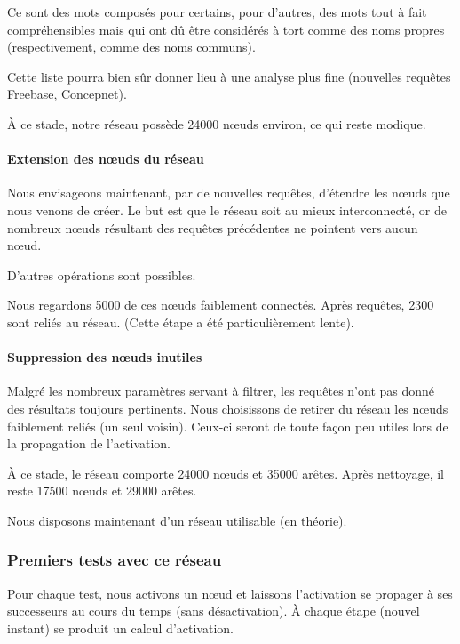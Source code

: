 \documentclass[a4paper, 12pt]{article}
\begin{document}
Ce sont des mots composés pour certains, pour d'autres, des mots tout à fait compréhensibles mais qui ont dû être considérés à tort comme des noms propres (respectivement, comme des noms communs).

Cette liste pourra bien sûr donner lieu à une analyse plus fine (nouvelles requêtes Freebase, Concepnet).

\`A ce stade, notre réseau possède 24000 nœuds environ, ce qui reste modique.

\paragraph{Extension des nœuds du réseau}

Nous envisageons maintenant, par de nouvelles requêtes, d'étendre les nœuds que nous venons de créer. Le but est que le réseau soit au mieux interconnecté, or de nombreux nœuds résultant des requêtes précédentes ne pointent vers aucun nœud.

D'autres opérations sont possibles.

Nous regardons 5000 de ces nœuds faiblement connectés. Après requêtes, 2300 sont reliés au réseau. (Cette étape a été particulièrement lente).

\paragraph{Suppression des nœuds inutiles}

Malgré les nombreux paramètres servant à filtrer, les requêtes n'ont pas donné des résultats toujours pertinents. Nous choisissons de retirer du réseau les nœuds faiblement reliés (un seul voisin). Ceux-ci seront de toute fa\c{c}on peu utiles lors de la propagation de l'activation.

\`A  ce stade, le réseau comporte 24000 nœuds et 35000 arêtes. Après nettoyage, il reste 17500 nœuds et 29000 arêtes.

Nous disposons maintenant d'un réseau utilisable (en théorie).

\subsubsection{Premiers tests avec ce réseau}

Pour chaque test, nous activons un nœud et laissons l'activation se propager à ses successeurs au cours du temps (sans désactivation). \`A chaque étape (nouvel instant) se produit un calcul d'activation.
\end{document}
